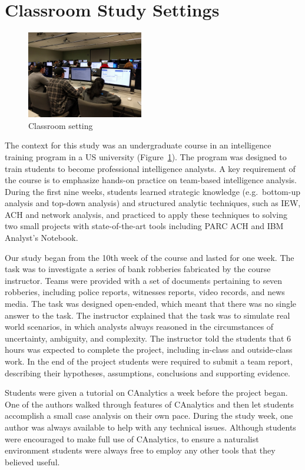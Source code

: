 \section{Classroom Study Settings}\label{classroom-study-settings}

\begin{figure}
\centering
\includegraphics[height=1.5in]{./img/classroom_setting.jpg}
\caption{Classroom setting}\label{fig:classroom}
\end{figure}

The context for this study was an undergraduate course in an intelligence
training program in a US university (Figure~\ref{fig:classroom}). The program
was designed to train students to become professional intelligence analysts. A
key requirement of the course is to emphasize hands-on practice on team-based
intelligence analysis. During the first nine weeks, students learned strategic
knowledge (e.g.~bottom-up analysis and top-down analysis) and structured
analytic techniques, such as IEW, ACH and network analysis, and practiced to
apply these techniques to solving two small projects with state-of-the-art tools
including PARC ACH and IBM Analyst's Notebook.

Our study began from the 10th week of the course and lasted for one
week. The task was to investigate a series of bank robberies fabricated
by the course instructor. Teams were provided with a set of documents
pertaining to seven robberies, including police reports, witnesses
reports, video records, and news media. The task was designed
open-ended, which meant that there was no single answer to the task. The
instructor explained that the task was to simulate real world scenarios,
in which analysts always reasoned in the circumstances of uncertainty,
ambiguity, and complexity. The instructor told the students that 6 hours
was expected to complete the project, including in-class and
outside-class work. In the end of the project students were required to
submit a team report, describing their hypotheses, assumptions,
conclusions and supporting evidence.

Students were given a tutorial on CAnalytics a week before the project
began. One of the authors walked through features of CAnalytics and then
let students accomplish a small case analysis on their own pace. During
the study week, one author was always available to help with any
technical issues. Although students were encouraged to make full use of
CAnalytics, to ensure a naturalist environment students were always free
to employ any other tools that they believed useful.

